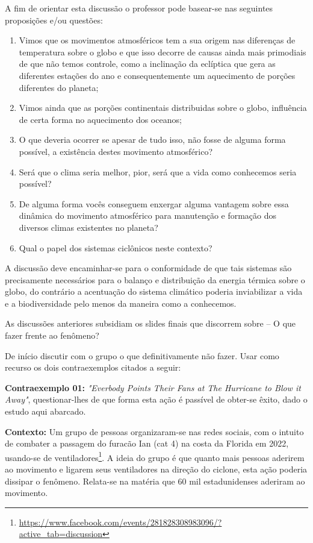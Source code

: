 \documentclass[
12pt,				%
openright,			%
oneside,			%
a4paper,			%
chapter=TITLE,		%
english,			%
brazil				%
]{abntex2}
\begin{document}
A fim de orientar esta discussão o professor pode basear-se nas seguintes proposições e/ou questões:
\begin{enumerate}[label=\alph *)]
		\item Vimos que os movimentos atmosféricos tem a sua origem nas diferenças de temperatura sobre o globo e que isso decorre de causas ainda mais primodiais de que não temos controle, como a inclinação da eclíptica que gera as diferentes estações do ano e consequentemente um aquecimento de porções diferentes do planeta;
		\item Vimos ainda que as porções continentais distribuidas sobre o globo, influência de certa forma no aquecimento dos oceanos;
		\item O que deveria ocorrer se apesar de tudo isso, não fosse de alguma forma possível, a existência destes movimento atmosférico?
		\item Será que o clima seria melhor, pior, será que a vida como conhecemos seria possível?
		\item De alguma forma vocês conseguem enxergar alguma vantagem sobre essa dinâmica do movimento atmosférico para manutenção e formação dos diversos climas existentes no planeta?
		\item Qual o papel dos sistemas ciclônicos neste contexto?
\end{enumerate}
A discussão deve encaminhar-se para o conformidade de que tais sistemas são precisamente necessários para o balanço e distribuição da energia térmica sobre o globo, do contrário a acentuação do sistema climático poderia inviabilizar a vida e a biodiversidade pelo menos da maneira como a conhecemos.

As discussões anteriores subsidiam os slides finais que discorrem sobre -- O que fazer frente ao fenômeno?

De início discutir com o grupo o que definitivamente não fazer. Usar como recurso os dois contraexemplos citados a seguir: 

\textbf{Contraexemplo 01:} \textit{"Everbody Points Their Fans at The Hurricane to Blow it Away"}, questionar-lhes de que forma esta ação é passível de obter-se êxito, dado o estudo aqui abarcado.
\par\textbf{Contexto:} Um grupo de pessoas organizaram-se nas redes sociais, com o intuito de combater a passagem do furacão Ian (cat 4) na costa da Florida em 2022, usando-se de ventiladores\footnote{\url{https://www.facebook.com/events/281828308983096/?active_tab=discussion}}. A ideia do grupo é que quanto mais pessoas aderirem ao movimento e ligarem seus ventiladores na direção do ciclone, esta ação poderia dissipar o fenômeno. Relata-se na matéria que 60 mil estadunidenses aderiram ao movimento.
\end{document}
